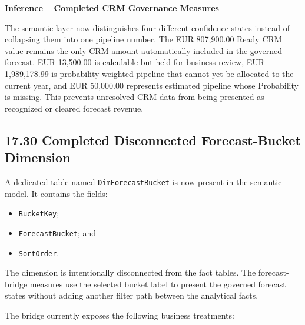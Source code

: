 \documentclass[11pt,a4paper]{article}
\begin{document}
\begin{inferencebox}

\textbf{Inference -- Completed CRM Governance Measures}

The semantic layer now distinguishes four different confidence states instead
of collapsing them into one pipeline number. The EUR 807,900.00 Ready CRM value
remains the only CRM amount automatically included in the governed forecast.
EUR 13,500.00 is calculable but held for business review, EUR 1,989,178.99 is
probability-weighted pipeline that cannot yet be allocated to the current year,
and EUR 50,000.00 represents estimated pipeline whose Probability is missing.
This prevents unresolved CRM data from being presented as recognized or cleared
forecast revenue.

\end{inferencebox}

\subsection{17.30 Completed Disconnected Forecast-Bucket Dimension}

A dedicated table named \texttt{DimForecastBucket} is now present in the
semantic model. It contains the fields:

\begin{itemize}[leftmargin=7mm,itemsep=2pt]
    \item \texttt{BucketKey};
    \item \texttt{ForecastBucket}; and
    \item \texttt{SortOrder}.
\end{itemize}

The dimension is intentionally disconnected from the fact tables. The
forecast-bridge measures use the selected bucket label to present the governed
forecast states without adding another filter path between the analytical
facts.

The bridge currently exposes the following business treatments:
\end{document}
